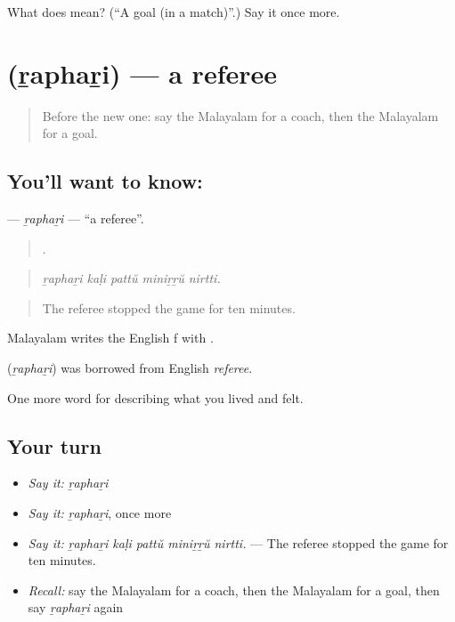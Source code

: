 \begin{tcolorbox}[breakable,colback=teal!4,colframe=teal!35!black,title={Before you move on}]
What does  mean? (\textquotedblleft{}A goal (in a match)\textquotedblright{}.) Say it once more.
\end{tcolorbox}
\section[\texorpdfstring{\ml{റഫറി} (ṟaphaṟi)}{റഫറി (ṟaphaṟi)}]{ (ṟaphaṟi) — a referee}

\label{lesson:ML-C568-raphari}



\begin{quote}
Before the new one: say the Malayalam for a coach, then the Malayalam for a goal.
\end{quote}

\subsection*{You'll want to know: }
\textbf{} — \emph{ṟaphaṟi} — \textquotedblleft{}a referee\textquotedblright{}.

\begin{quote}
    .
\end{quote}

\begin{quote}
\emph{ṟaphaṟi kaḷi pattŭ miniṟṟŭ nirtti.}
\end{quote}

\begin{quote}
The referee stopped the game for ten minutes.
\end{quote}

Malayalam writes the English f with .

\begin{cousinweb}
\textbf{} (\emph{ṟaphaṟi}) was borrowed from English \emph{referee}.
\end{cousinweb}

\begin{grammarlens}[title={What you've built}]
One more word for describing what you lived and felt.
\end{grammarlens}

\subsection*{Your turn}
\begin{itemize}
\raggedright
  \item \emph{Say it:} \emph{ṟaphaṟi}
  \item \emph{Say it:} \emph{ṟaphaṟi}, once more
  \item \emph{Say it:} \emph{ṟaphaṟi kaḷi pattŭ miniṟṟŭ nirtti.} — The referee stopped the game for ten minutes.
  \item \emph{Recall:} say the Malayalam for a coach, then the Malayalam for a goal, then say \emph{ṟaphaṟi} again
\end{itemize}

